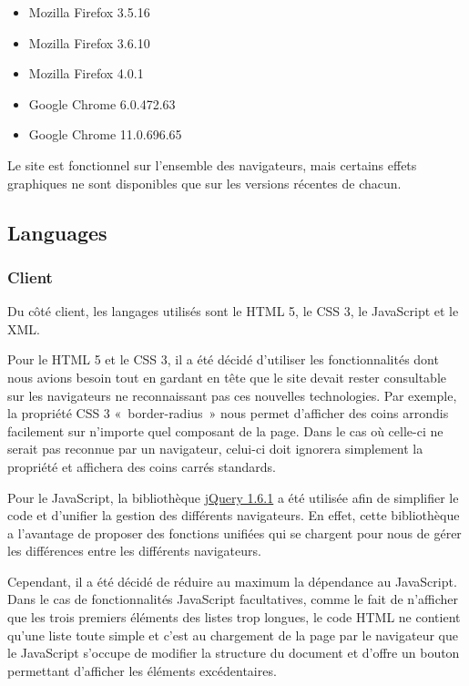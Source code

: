 \documentclass[letter, 11pt]{report}
\begin{document}
\begin{itemize}
	\item Mozilla Firefox 3.5.16
	\item Mozilla Firefox 3.6.10
	\item Mozilla Firefox 4.0.1
	\item Google Chrome 6.0.472.63
	\item Google Chrome 11.0.696.65
\end{itemize}

Le site est fonctionnel sur l'ensemble des navigateurs, mais certains effets graphiques ne sont disponibles que sur les versions récentes de chacun.

\subsection{Languages}
\subsubsection{Client}
Du côté client, les langages utilisés sont le HTML 5, le CSS 3, le JavaScript et le XML.

Pour le HTML 5 et le CSS 3, il a été décidé d'utiliser les fonctionnalités dont nous avions besoin tout en gardant en tête que le site devait rester consultable sur les navigateurs ne reconnaissant pas ces nouvelles technologies. Par exemple, la propriété CSS 3 «~border-radius~» nous permet d'afficher des coins arrondis facilement sur n'importe quel composant de la page. Dans le cas où celle-ci ne serait pas reconnue par un navigateur, celui-ci doit ignorera simplement la propriété et affichera des coins carrés standards.

Pour le JavaScript, la bibliothèque \href{http://jquery.com/}{jQuery 1.6.1} a été utilisée afin de simplifier le code et d'unifier la gestion des différents navigateurs. En effet, cette bibliothèque a l'avantage de proposer des fonctions unifiées qui se chargent pour nous de gérer les différences entre les différents navigateurs.

Cependant, il a été décidé de réduire au maximum la dépendance au JavaScript. Dans le cas de fonctionnalités JavaScript facultatives, comme le fait de n'afficher que les trois premiers éléments des listes trop longues, le code HTML ne contient qu'une liste toute simple et c'est au chargement de la page par le navigateur que le JavaScript s'occupe de modifier la structure du document et d'offre un bouton permettant d'afficher les éléments excédentaires.
\end{document}
